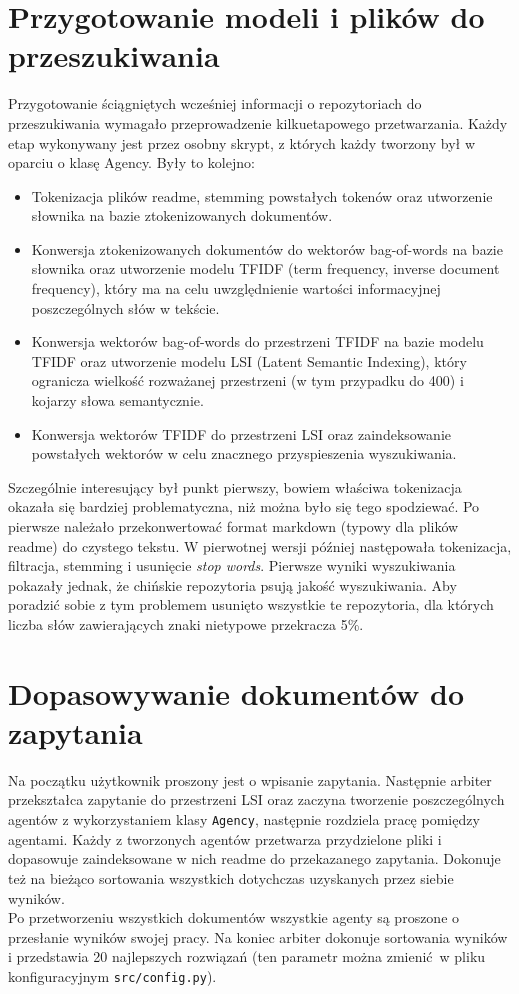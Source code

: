 \documentclass[12pt, oneside, final]{report}
\begin{document}
\section*{Przygotowanie modeli i plików do przeszukiwania}
Przygotowanie ściągniętych wcześniej informacji o repozytoriach do przeszukiwania wymagało przeprowadzenie kilkuetapowego przetwarzania. Każdy etap wykonywany jest przez osobny skrypt, z których każdy tworzony był w oparciu o klasę Agency. Były to kolejno:
\begin{itemize}
	\item{Tokenizacja plików readme, stemming powstałych tokenów oraz utworzenie słownika na bazie ztokenizowanych dokumentów.}
	\item{Konwersja ztokenizowanych dokumentów do wektorów bag-of-words na bazie słownika oraz utworzenie modelu TFIDF (term frequency, inverse document frequency), który ma na celu uwzględnienie wartości informacyjnej poszczególnych słów w tekście.}
	\item{Konwersja wektorów bag-of-words do przestrzeni TFIDF na bazie modelu TFIDF oraz utworzenie modelu LSI (Latent Semantic Indexing), który ogranicza wielkość rozważanej przestrzeni (w tym przypadku do 400) i kojarzy słowa semantycznie.}
	\item{Konwersja wektorów TFIDF do przestrzeni LSI oraz zaindeksowanie powstałych wektorów w celu znacznego przyspieszenia wyszukiwania.}
\end{itemize}

Szczególnie interesujący był punkt pierwszy, bowiem właściwa tokenizacja okazała się bardziej problematyczna, niż można było się tego spodziewać. Po pierwsze należało przekonwertować format markdown (typowy dla plików readme) do czystego tekstu. W pierwotnej wersji później następowała tokenizacja, filtracja, stemming i usunięcie \textit{stop words}. Pierwsze wyniki wyszukiwania pokazały jednak, że chińskie repozytoria psują jakość wyszukiwania. Aby poradzić sobie z tym problemem usunięto wszystkie te repozytoria, dla których liczba słów zawierających znaki nietypowe przekracza 5\%.

\section*{Dopasowywanie dokumentów do zapytania}
Na początku użytkownik proszony jest o wpisanie zapytania. Następnie arbiter przekształca zapytanie do przestrzeni LSI oraz zaczyna tworzenie poszczególnych agentów z wykorzystaniem klasy \texttt{Agency},  następnie rozdziela pracę pomiędzy agentami.
Każdy z tworzonych agentów przetwarza przydzielone pliki i dopasowuje zaindeksowane w nich readme do przekazanego zapytania. Dokonuje też na bieżąco sortowania wszystkich dotychczas uzyskanych przez siebie wyników.
\\
Po przetworzeniu wszystkich dokumentów wszystkie agenty są proszone o przesłanie wyników swojej pracy. Na koniec arbiter dokonuje sortowania wyników i przedstawia 20 najlepszych rozwiązań (ten parametr można zmienić w pliku konfiguracyjnym \texttt{src/config.py}).
\end{document}
